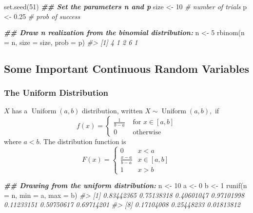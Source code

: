 \documentclass[
  14pt,
]{memoir}
\newenvironment{Shaded}{\begin{snugshade}}{\end{snugshade}}
\newcommand{\AttributeTok}[1]{\textcolor[rgb]{0.77,0.63,0.00}{#1}}
\newcommand{\CommentTok}[1]{\textcolor[rgb]{0.56,0.35,0.01}{\textit{#1}}}
\newcommand{\DecValTok}[1]{\textcolor[rgb]{0.00,0.00,0.81}{#1}}
\newcommand{\DocumentationTok}[1]{\textcolor[rgb]{0.56,0.35,0.01}{\textbf{\textit{#1}}}}
\newcommand{\FloatTok}[1]{\textcolor[rgb]{0.00,0.00,0.81}{#1}}
\newcommand{\FunctionTok}[1]{\textcolor[rgb]{0.00,0.00,0.00}{#1}}
\newcommand{\NormalTok}[1]{#1}
\newcommand{\OtherTok}[1]{\textcolor[rgb]{0.56,0.35,0.01}{#1}}
\begin{document}
\begin{Shaded}
\begin{Highlighting}[]
\FunctionTok{set.seed}\NormalTok{(}\DecValTok{51}\NormalTok{)}
\DocumentationTok{\#\# Set the parameters n and p}
\NormalTok{size }\OtherTok{\textless{}{-}}   \DecValTok{10} \CommentTok{\# number of trials}
\NormalTok{p    }\OtherTok{\textless{}{-}} \FloatTok{0.25} \CommentTok{\# prob of success}

\DocumentationTok{\#\# Draw n realization from the binomial distribution:}
\NormalTok{n }\OtherTok{\textless{}{-}} \DecValTok{5}
\FunctionTok{rbinom}\NormalTok{(}\AttributeTok{n =}\NormalTok{ n, }\AttributeTok{size =}\NormalTok{ size, }\AttributeTok{prob =}\NormalTok{ p)}
\CommentTok{\#\textgreater{} [1] 4 1 2 6 1}
\end{Highlighting}
\end{Shaded}

\hypertarget{some-important-continuous-random-variables}{%
\subsection{Some Important Continuous Random Variables}\label{some-important-continuous-random-variables}}

\hypertarget{the-uniform-distribution}{%
\subsubsection{The Uniform Distribution}\label{the-uniform-distribution}}

\(X\) has a \(\operatorname{Uniform}(a, b)\) distribution, written \(X\sim \operatorname{Uniform}(a, b),\) if
\[
f(x)=\left\{\begin{array}{ll}
\frac{1}{b-a} & \text { for } x \in[a, b] \\
0 & \text { otherwise }
\end{array}\right.
\]
where \(a<b\). The distribution function is
\[
F(x)=\left\{\begin{array}{ll}
0 & x<a \\
\frac{x-a}{b-a} & x \in[a, b] \\
1 & x>b
\end{array}\right.
\]

\begin{Shaded}
\begin{Highlighting}[]
\DocumentationTok{\#\# Drawing from the uniform distribution:}
\NormalTok{n }\OtherTok{\textless{}{-}} \DecValTok{10}
\NormalTok{a }\OtherTok{\textless{}{-}} \DecValTok{0}
\NormalTok{b }\OtherTok{\textless{}{-}} \DecValTok{1}
\FunctionTok{runif}\NormalTok{(}\AttributeTok{n =}\NormalTok{ n, }\AttributeTok{min =}\NormalTok{ a, }\AttributeTok{max =}\NormalTok{ b)}
\CommentTok{\#\textgreater{}  [1] 0.83442365 0.75138318 0.40601047 0.97101998 0.11233151 0.50750617 0.69714201}
\CommentTok{\#\textgreater{}  [8] 0.17104008 0.25448233 0.01813812}
\end{Highlighting}
\end{Shaded}
\end{document}
